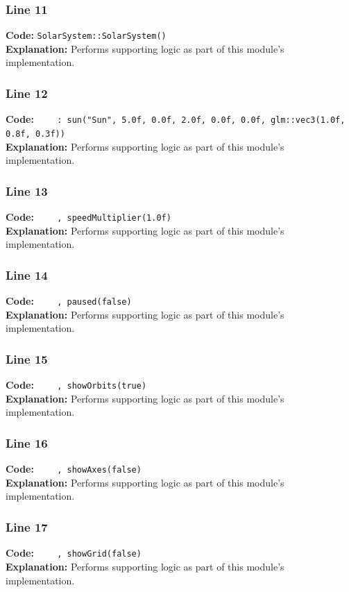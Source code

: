 \documentclass[11pt,a4paper]{article}
\begin{document}
\subsubsection*{Line 11}
\textbf{Code:} \verb|SolarSystem::SolarSystem()|\\
\textbf{Explanation:} Performs supporting logic as part of this module's implementation.

\subsubsection*{Line 12}
\textbf{Code:} \verb|    : sun("Sun", 5.0f, 0.0f, 2.0f, 0.0f, 0.0f, glm::vec3(1.0f, 0.8f, 0.3f))|\\
\textbf{Explanation:} Performs supporting logic as part of this module's implementation.

\subsubsection*{Line 13}
\textbf{Code:} \verb|    , speedMultiplier(1.0f)|\\
\textbf{Explanation:} Performs supporting logic as part of this module's implementation.

\subsubsection*{Line 14}
\textbf{Code:} \verb|    , paused(false)|\\
\textbf{Explanation:} Performs supporting logic as part of this module's implementation.

\subsubsection*{Line 15}
\textbf{Code:} \verb|    , showOrbits(true)|\\
\textbf{Explanation:} Performs supporting logic as part of this module's implementation.

\subsubsection*{Line 16}
\textbf{Code:} \verb|    , showAxes(false)|\\
\textbf{Explanation:} Performs supporting logic as part of this module's implementation.

\subsubsection*{Line 17}
\textbf{Code:} \verb|    , showGrid(false)|\\
\textbf{Explanation:} Performs supporting logic as part of this module's implementation.
\end{document}

